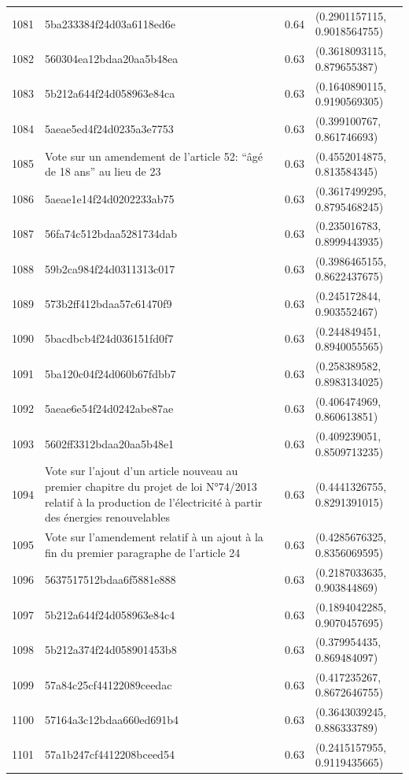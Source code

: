\begin{table}[ht]
\begin{tabular}{rlrl}
  1081 & 5ba233384f24d03a6118ed6e & 0.64 & (0.2901157115, 0.9018564755) \\ 
  1082 & 560304ea12bdaa20aa5b48ea & 0.63 & (0.3618093115, 0.879655387) \\ 
  1083 & 5b212a644f24d058963e84ca & 0.63 & (0.1640890115, 0.9190569305) \\ 
  1084 & 5aeae5ed4f24d0235a3e7753 & 0.63 & (0.399100767, 0.861746693) \\ 
  1085 & Vote sur un amendement de l'article 52: “âgé de 18 ans” au lieu de 23 & 0.63 & (0.4552014875, 0.813584345) \\ 
  1086 & 5aeae1e14f24d0202233ab75 & 0.63 & (0.3617499295, 0.8795468245) \\ 
  1087 & 56fa74c512bdaa5281734dab & 0.63 & (0.235016783, 0.8999443935) \\ 
  1088 & 59b2ca984f24d0311313c017 & 0.63 & (0.3986465155, 0.8622437675) \\ 
  1089 & 573b2ff412bdaa57c61470f9 & 0.63 & (0.245172844, 0.903552467) \\ 
  1090 & 5bacdbcb4f24d036151fd0f7 & 0.63 & (0.244849451, 0.8940055565) \\ 
  1091 & 5ba120c04f24d060b67fdbb7 & 0.63 & (0.258389582, 0.8983134025) \\ 
  1092 & 5aeae6e54f24d0242abe87ae & 0.63 & (0.406474969, 0.860613851) \\ 
  1093 & 5602ff3312bdaa20aa5b48e1 & 0.63 & (0.409239051, 0.8509713235) \\ 
  1094 & Vote sur l'ajout d'un article nouveau au premier chapitre du projet de loi N°74/2013 relatif à la production de l'électricité à partir des énergies renouvelables & 0.63 & (0.4441326755, 0.8291391015) \\ 
  1095 & Vote sur l'amendement relatif à un ajout à la fin du premier paragraphe de l'article 24 & 0.63 & (0.4285676325, 0.8356069595) \\ 
  1096 & 5637517512bdaa6f5881e888 & 0.63 & (0.2187033635, 0.903844869) \\ 
  1097 & 5b212a644f24d058963e84c4 & 0.63 & (0.1894042285, 0.9070457695) \\ 
  1098 & 5b212a374f24d058901453b8 & 0.63 & (0.379954435, 0.869484097) \\ 
  1099 & 57a84c25cf44122089ceedac & 0.63 & (0.417235267, 0.8672646755) \\ 
  1100 & 57164a3c12bdaa660ed691b4 & 0.63 & (0.3643039245, 0.886333789) \\ 
  1101 & 57a1b247cf4412208bceed54 & 0.63 & (0.2415157955, 0.9119435665) \\ 

\end{tabular}
\end{table}
